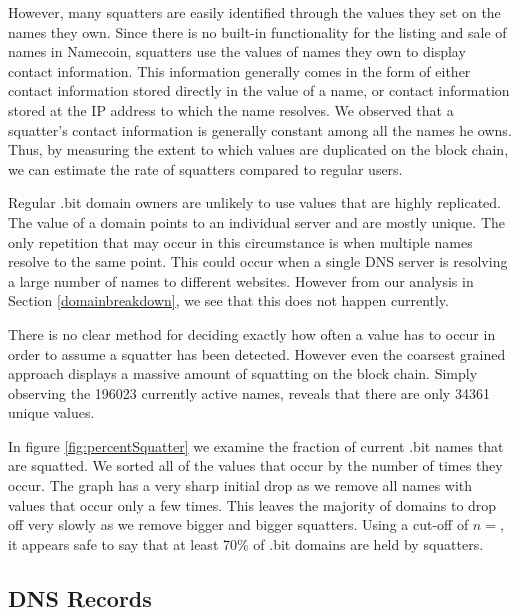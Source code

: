 However, many squatters are easily identified through the values they set on the names they own. Since there is no built-in functionality for the listing and sale of names in Namecoin, squatters use the values of names they own to display contact information. This information generally comes in the form of either contact information stored directly in the value of a name, or contact information stored at the IP address to which the name resolves.  We observed that a squatter's contact information is generally constant among all the names he owns. Thus, by measuring the extent to which values are duplicated on the block chain, we can estimate the rate of squatters compared to regular users.

Regular .bit domain owners are unlikely to use values that are highly replicated. The value of a domain points to an individual server and are mostly unique. The only repetition that may occur in this circumstance is when multiple names resolve to the same point. This could occur when a single DNS server is resolving a large number of names to different websites. However from our analysis in Section \ref{domainbreakdown}, we see that this does not happen currently.

There is no clear method for deciding exactly how often a value has to occur in order to assume a squatter has been detected. However even the coarsest grained approach displays a massive amount of squatting on the block chain. Simply observing the 196023 currently active names, reveals that there are only 34361 unique values.

In figure \ref{fig:percentSquatter} we examine the fraction of current .bit names that are squatted. We sorted all of the values that occur by the number of times they occur. 
The graph has a very sharp initial drop as we remove all names with values that occur only a few times. This leaves the majority of domains to drop off very slowly as we remove bigger and bigger squatters. Using a cut-off of $n=$\hi{[fill in]}, it appears safe to say that at least 70\% of .bit domains are held by squatters.

\subsection{DNS Records}

